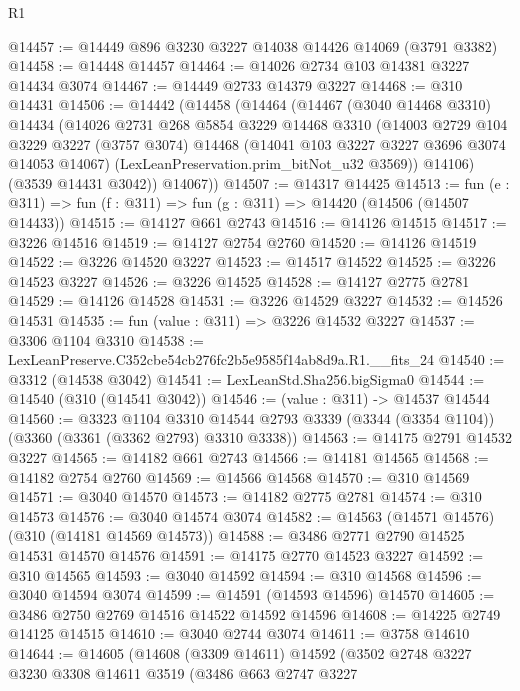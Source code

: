 \begin{lexlean}{R1}
\begin{coremodule}
@14457 := @14449 @896 @3230 @3227 @14038 @14426 @14069 (@3791 @3382)
@14458 := @14448 @14457
@14464 := @14026 @2734 @103 @14381 @3227 @14434 @3074
@14467 := @14449 @2733 @14379 @3227
@14468 := @310 @14431
@14506 := @14442
    (@14458
      (@14464
        (@14467
          (@3040 @14468 @3310)
          @14434
          (@14026
            @2731
            @268
            @5854
            @3229
            @14468
            @3310
            (@14003
              @2729
              @104
              @3229
              @3227
              (@3757 @3074)
              @14468
              (@14041 @103 @3227 @3227 @3696 @3074 @14053 @14067)
              (LexLeanPreservation.prim_bitNot_u32 @3569))
            @14106)
          (@3539 @14431 @3042))
        @14067))
@14507 := @14317 @14425
@14513 := fun (e : @311) => fun (f : @311) => fun (g : @311) => @14420 (@14506 (@14507 @14433))
@14515 := @14127 @661 @2743
@14516 := @14126 @14515
@14517 := @3226 @14516
@14519 := @14127 @2754 @2760
@14520 := @14126 @14519
@14522 := @3226 @14520 @3227
@14523 := @14517 @14522
@14525 := @3226 @14523 @3227
@14526 := @3226 @14525
@14528 := @14127 @2775 @2781
@14529 := @14126 @14528
@14531 := @3226 @14529 @3227
@14532 := @14526 @14531
@14535 := fun (value : @311) => @3226 @14532 @3227
@14537 := @3306 @1104 @3310
@14538 := LexLeanPreserve.C352cbe54cb276fc2b5e9585f14ab8d9a.R1.__fits_24
@14540 := @3312 (@14538 @3042)
@14541 := LexLeanStd.Sha256.bigSigma0
@14544 := @14540 (@310 (@14541 @3042))
@14546 := (value : @311) -> @14537 @14544
@14560 := @3323
    @1104
    @3310
    @14544
    @2793
    @3339
    (@3344 (@3354 @1104))
    (@3360 (@3361 (@3362 @2793) @3310 @3338))
@14563 := @14175 @2791 @14532 @3227
@14565 := @14182 @661 @2743
@14566 := @14181 @14565
@14568 := @14182 @2754 @2760
@14569 := @14566 @14568
@14570 := @310 @14569
@14571 := @3040 @14570
@14573 := @14182 @2775 @2781
@14574 := @310 @14573
@14576 := @3040 @14574 @3074
@14582 := @14563 (@14571 @14576) (@310 (@14181 @14569 @14573))
@14588 := @3486 @2771 @2790 @14525 @14531 @14570 @14576
@14591 := @14175 @2770 @14523 @3227
@14592 := @310 @14565
@14593 := @3040 @14592
@14594 := @310 @14568
@14596 := @3040 @14594 @3074
@14599 := @14591 (@14593 @14596) @14570
@14605 := @3486 @2750 @2769 @14516 @14522 @14592 @14596
@14608 := @14225 @2749 @14125 @14515
@14610 := @3040 @2744 @3074
@14611 := @3758 @14610
@14644 := @14605
    (@14608
      (@3309 @14611)
      @14592
      (@3502
        @2748
        @3227
        @3230
        @3308
        @14611
        @3519
        (@3486
          @663
          @2747
          @3227

\end{coremodule}
\end{lexlean}
